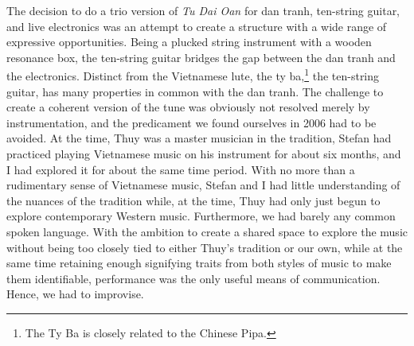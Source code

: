 \documentclass[a4paper]{article}
\begin{document}

The decision to do a trio version of \emph{Tu Dai Oan} for dan tranh, ten-string guitar, and live electronics was an attempt to create a structure with a wide range of expressive opportunities. Being a plucked string instrument with a wooden resonance box, the ten-string guitar bridges the gap between the dan tranh and the electronics. Distinct from the Vietnamese lute, the ty ba,\footnote{The Ty Ba is closely related to the Chinese Pipa.} the ten-string guitar, has many properties in common with the dan tranh. The challenge to create a coherent version of the tune was obviously not resolved merely by instrumentation, and the predicament we found ourselves in 2006 had to be avoided. At the time, Thuy was a master musician in the tradition, Stefan had practiced playing Vietnamese music on his instrument for about six months, and I had explored it for about the same time period. With no more than a rudimentary sense of Vietnamese music, Stefan and I had little understanding of the nuances of the tradition while, at the time, Thuy had only just begun to explore contemporary Western music. Furthermore, we had barely any common spoken language. With the ambition to create a shared space to explore the music without being too closely tied to either Thuy’s tradition or our own, while at the same time retaining enough signifying traits from both styles of music to make them identifiable, performance was the only useful means of communication. Hence, we had to improvise. 
\end{document}
